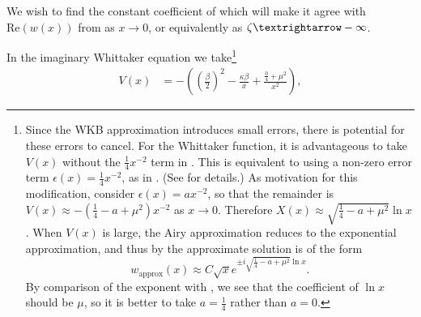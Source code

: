 We wish to find the constant coefficient of  which will make it agree with $\textrm{Re}(w(x))$ from  as $x\to0$, or equivalently as $\zeta\textrightarrow-\infty$. 

In the imaginary Whittaker equation  we take\footnote{\label{fn:modified-potential}Since the WKB approximation introduces small errors, there is potential for these errors to cancel. For the Whittaker function, it is advantageous to take $V(x)$ without the $\tfrac{1}{4}x^{-2}$ term in . This is equivalent to using a non-zero error term $\epsilon(x)=\tfrac{1}{4}x^{-2}$, as in . (See \cite{olver1997} for details.) As motivation for this modification, consider $\epsilon(x)=ax^{-2}$, so that the remainder is $V(x)\approx-(\tfrac{1}{4}-a+\mu^{2})x^{-2}$ as $x\to0$. Therefore $X(x)\approx\sqrt{\tfrac{1}{4}-a+\mu^{2}}\ln x$. When $V(x)$ is large, the Airy approximation reduces to the exponential approximation, and thus by  the approximate solution is of the form 
\[
w_{\mathrm{approx}}(x)\approx C\sqrt{x}e^{\pm i\sqrt{\tfrac{1}{4}-a+\mu^{2}}\ln x}.
\]
 By comparison of the exponent with , we see that the coefficient of $\ln x$ should be $\mu$, so it is better to take $a=\tfrac{1}{4}$ rather than $a=0$. } 
\begin{align*}
V(x) & =-\left(\left(\frac{\beta}{2}\right)^{2}-\frac{\kappa\beta}{x}+\frac{\tfrac{0}{4}+\mu^{2}}{x^{2}}\right),
\end{align*}

